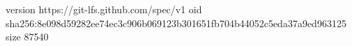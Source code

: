 version https://git-lfs.github.com/spec/v1
oid sha256:8e098d59282ee74ec3c906b069123b301651fb704b44052c5eda37a9ed963125
size 87540
